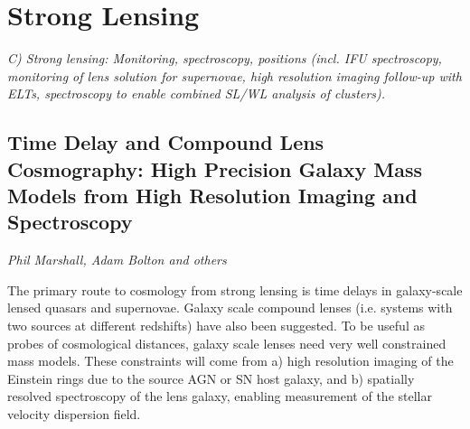 
\section{Strong Lensing}
\label{sec:sl}

{\em C) Strong lensing: Monitoring, spectroscopy, positions (incl. IFU
spectroscopy, monitoring of lens solution for supernovae, high
resolution imaging follow-up with ELTs, spectroscopy to enable combined
SL/WL analysis of clusters).}

%
%


\subsection{Time Delay and Compound Lens Cosmography: High Precision Galaxy Mass Models from High Resolution Imaging and Spectroscopy}
{\it Phil Marshall, Adam Bolton and others}

The primary route to cosmology from strong lensing is time delays in
galaxy-scale lensed quasars and supernovae. Galaxy scale compound lenses
(i.e. systems with two sources at different redshifts) have also been
suggested.
To be useful as probes of cosmological distances, galaxy scale lenses
need very well constrained mass models. These constraints will come from
a) high resolution imaging of the Einstein rings due to the source
AGN or SN host galaxy, and b) spatially resolved spectroscopy of the lens
galaxy, enabling measurement of the stellar velocity dispersion field.


